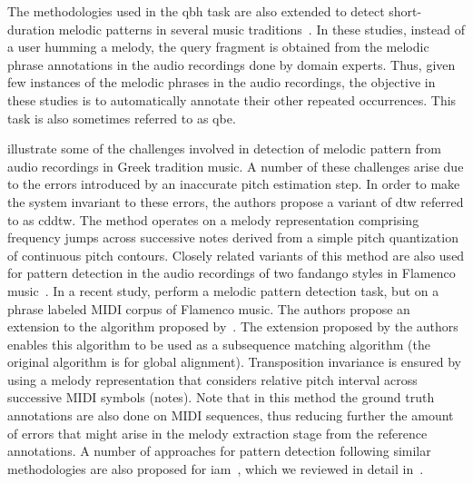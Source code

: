 The methodologies used in the \gls{qbh} task are also extended to detect short-duration melodic patterns in several music traditions~\citep{pikrakis2003recognition,pikrakis2012tracking,pikrakis2016detection,Ross2012b,dutta2014modified}. In these studies, instead of a user humming a melody, the query fragment is obtained from the melodic phrase annotations in the audio recordings done by domain experts. Thus, given few instances of the melodic phrases in the audio recordings, the objective in these studies is to automatically annotate their other repeated occurrences. This task is also sometimes referred to as \gls{qbe}.  

\cite{pikrakis2003recognition} illustrate some of the challenges involved in detection of melodic pattern from audio recordings in Greek tradition music. A number of these challenges arise due to the errors introduced by an inaccurate pitch estimation step. In order to make the system invariant to these errors, the authors propose a variant of \gls{dtw} referred to as \gls{cddtw}. The method operates on a melody representation comprising frequency jumps across successive notes derived from a simple pitch quantization of continuous pitch contours. Closely related variants of this method are also used for pattern detection in the audio recordings of two fandango styles in Flamenco music~\citep{pikrakis2012tracking,gomez2012automatic}. In a recent study, \cite{pikrakis2016detection} perform a melodic pattern detection task, but on a phrase labeled MIDI corpus of Flamenco music. The authors propose an extension to the algorithm proposed by~\cite{needleman1970general}. The extension proposed by the authors enables this algorithm to be used as a subsequence matching algorithm (the original algorithm is for global alignment). Transposition invariance is ensured by using a melody representation that considers relative pitch interval across successive MIDI symbols (notes). Note that in this method the ground truth annotations are also done on MIDI sequences, thus reducing further the amount of errors that might arise in the melody extraction stage from the reference annotations. A number of approaches for pattern detection following similar methodologies are also proposed for \gls{iam}~\citep{Ross2012b,dutta2014modified,ganguli2015efficient}, which we reviewed in detail in~. 

